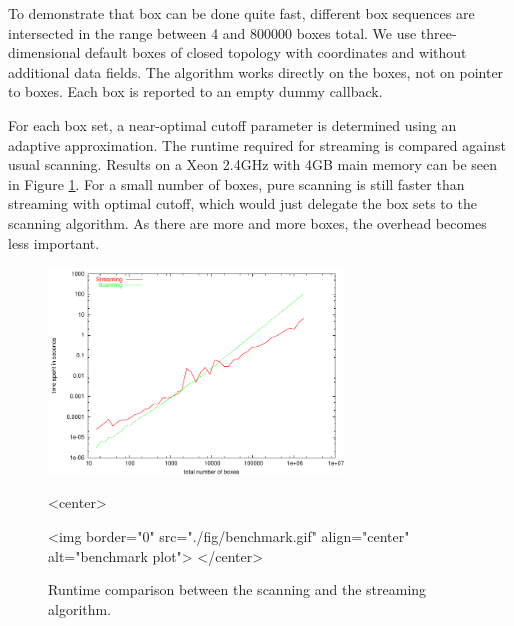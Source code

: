 To demonstrate that box  can be done quite fast, different
box sequences are intersected in the range between 4 and 800000 boxes
total.  We use three-dimensional default boxes of closed topology with
 coordinates and without additional data fields.  The
algorithm works directly on the boxes, not on pointer to boxes. Each
box  is reported to an empty dummy callback.

For each box set, a near-optimal cutoff parameter is determined using
an adaptive approximation. The runtime required for streaming is
compared against usual scanning.  Results on a Xeon 2.4GHz with 4GB
main memory can be seen in Figure \ref{fig_benchmark}. For a small
number of boxes, pure scanning is still faster than streaming with
optimal cutoff, which would just delegate the box sets to the scanning
algorithm. As there are more and more boxes, the overhead becomes less
important. 

\begin{figure}[htbp]
\begin{ccTexOnly}
\begin{center}
  \includegraphics[width=0.7\textwidth]{Box_intersection_d/fig/benchmark}
\end{center}
\end{ccTexOnly}
\begin{ccHtmlOnly}
<center>
\end{ccHtmlOnly}
  \caption{Runtime comparison between the scanning and the streaming algorithm.
  \label{fig_benchmark}}

\begin{ccHtmlOnly}
<img border="0" src="./fig/benchmark.gif" align="center" alt="benchmark plot">
</center>
\end{ccHtmlOnly}
\end{figure}

